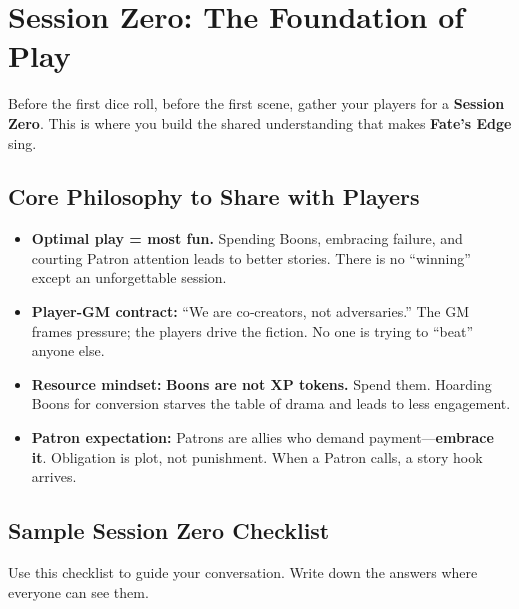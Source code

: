 \section{Session Zero: The Foundation of Play}
\label{sec:gm-session-zero}

Before the first dice roll, before the first scene, gather your players for a \textbf{Session Zero}. This is where you build the shared understanding that makes \textbf{Fate's Edge} sing.

\subsection{Core Philosophy to Share with Players}
\label{sub:gm-core-philosophy-players}

\begin{itemize}
    \item \textbf{Optimal play = most fun.} Spending Boons, embracing failure, and courting Patron attention leads to better stories. There is no “winning” except an unforgettable session.
    \item \textbf{Player-GM contract:} “We are co‑creators, not adversaries.” The GM frames pressure; the players drive the fiction. No one is trying to “beat” anyone else.
    \item \textbf{Resource mindset:} \textbf{Boons are not XP tokens.} Spend them. Hoarding Boons for conversion starves the table of drama and leads to less engagement.
    \item \textbf{Patron expectation:} Patrons are allies who demand payment—\textbf{embrace it}. Obligation is plot, not punishment. When a Patron calls, a story hook arrives.
\end{itemize}

\subsection{Sample Session Zero Checklist}
\label{sub:gm-session-zero-checklist}

Use this checklist to guide your conversation. Write down the answers where everyone can see them.

